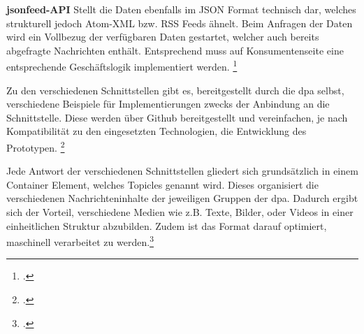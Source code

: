 \textbf{jsonfeed-API}
Stellt die Daten ebenfalls im JSON Format technisch dar, welches strukturell jedoch Atom-XML bzw. RSS Feeds ähnelt. Beim Anfragen der Daten wird ein Vollbezug der verfügbaren Daten gestartet, welcher auch bereits abgefragte Nachrichten enthält. Entsprechend muss auf Konsumentenseite eine entsprechende Geschäftslogik implementiert werden. \footcite[Vgl.][]{DpaApiDocumentation.APIs.2024}
\newpage

Zu den verschiedenen Schnittstellen gibt es, bereitgestellt durch die dpa selbst, verschiedene Beispiele für Implementierungen zwecks der Anbindung an die Schnittstelle. Diese werden über Github bereitgestellt und vereinfachen, je nach Kompatibilität zu den eingesetzten Technologien, die Entwicklung des Prototypen. \footcite[Vgl.][]{dpa_newslab.github.2024}{}{}

Jede Antwort der verschiedenen Schnittstellen gliedert sich grundsätzlich in einem Container Element, welches Topicles genannt wird. Dieses organisiert die verschiedenen Nachrichteninhalte der jeweiligen Gruppen der dpa. Dadurch ergibt sich der Vorteil, verschiedene Medien wie z.B. Texte, Bilder, oder Videos in einer einheitlichen Struktur abzubilden. Zudem ist das Format darauf optimiert, maschinell verarbeitet zu werden.\footcite[Vgl.][]{DpaApiDocumentation.Format.2024}

